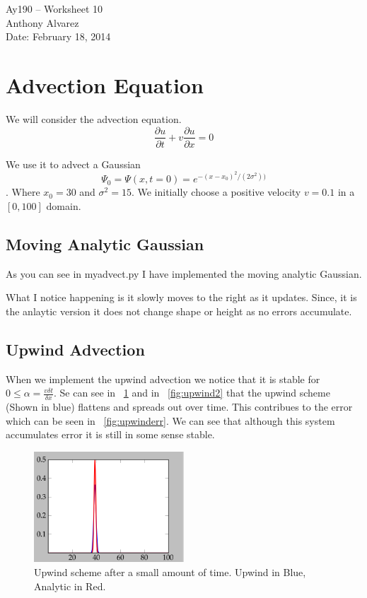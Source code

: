 \documentclass[11pt,letterpaper]{article}
\begin{document}
\begin{center}
\Large
Ay190 -- Worksheet 10\\
Anthony Alvarez\\
Date: February 18, 2014
\end{center}

\section{Advection Equation}

We will consider the advection equation.
$$ \frac{\partial u}{\partial t} + v \frac{\partial u}{\partial x} = 0$$

We use it to advect a Gaussian $$ \Psi_0 = \Psi(x,t=0) = e^{-(x-x_0)^2/(2\sigma^2))}$$.
Where $x_0 = 30$ and $\sigma^2 = 15$. We initially choose a positive velocity
$v=0.1$ in a $[0,100]$ domain. 

\subsection{Moving Analytic Gaussian}

As you can see in myadvect.py I have implemented the moving analytic Gaussian.

What I notice happening is it slowly moves to the right as it updates. Since, 
it is the anlaytic version it does not change shape or height as no errors
accumulate. 

\subsection{Upwind Advection}

When we implement the upwind advection we notice that it is stable for 
$0\leq \alpha = \frac{v\delta t}{\delta x}$. Se can see in ~\ref{fig:upwind1}
and in ~\ref{fig:upwind2} that the upwind scheme (Shown in blue) flattens and
spreads out over time. This contribues to the error which can be seen in
~\ref{fig:upwinderr}. We can see that although this system accumulates error it 
is still in some sense stable. 

\begin{figure}[bth]
\centering
\includegraphics[width=0.5\textwidth]{Upwind1.png}
\caption{Upwind scheme after a small amount of time. Upwind in Blue, Analytic in Red.}
\label{fig:upwind1}
\end{figure}
\end{document}
